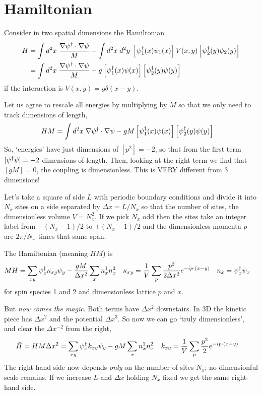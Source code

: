 \section{Hamiltonian}\label{sec:hamiltonian}

Consider in two spatial dimensions the Hamiltonian
\begin{align}
	H
	&= \int d^2x\; \frac{\nabla \psi{}^{\dagger} \cdot \nabla \psi}{M} - \int d^2x\; d^2y\; \left[\psi{}^{\dagger}_1(x) \psi_1(x)\right] V(x,y) \left[\psi{}^{\dagger}_2(y) \psi_2(y)\right]
	\\
	&= \int d^2x\; \frac{\nabla \psi{}^{\dagger} \cdot \nabla \psi}{M} - g \left[\psi{}^{\dagger}_1(x) \psi(x)\right] \left[\psi{}^{\dagger}_2(y) \psi(y)\right]
\end{align}
if the interaction is $V(x,y) = g \delta(x-y)$.

Let us agree to rescale all energies by multiplying by $M$ so that we only need to track dimensions of length,
\begin{align}
	HM
	&= \int d^2x\; \nabla \psi{}^{\dagger} \cdot \nabla \psi - gM \left[\psi{}^{\dagger}_1(x) \psi(x)\right] \left[\psi{}^{\dagger}_2(y) \psi(y)\right]
\end{align}
So, `energies' have just dimensions of $[p^2] = -2$, so that from the first term $[\psi{}^{\dagger}\psi] = -2$ dimensions of length.
Then, looking at the right term we find that $[gM] = 0$, the coupling is dimensionless.
This is VERY different from 3 dimensions!

Let's take a square of side $L$ with periodic boundary conditions and divide it into $N_x$ sites on a side separated by $\Delta x = L/N_x$ so that the number of sites, the dimensionless volume $V=N_x^2$.
If we pick $N_x$ odd then the sites take an integer label from $-(N_x-1)/2$ to $+(N_x-1)/2$ and the dimensionless momenta $p$ are $2\pi / N_x$ times that same span.

The Hamiltonian (meaning $HM$) is
\begin{align}
	MH &= \sum_{xy} \psi{}^{\dagger}_x \kappa_{xy} \psi_y - \frac{gM}{\Delta x^2} \sum_{x} n^1_x n^2_x
	&
	\kappa_{xy} &= \frac{1}{V} \sum_{p} \frac{p^2}{2\Delta x^2} e^{-i p \cdot (x-y)}
	&
	n_x &= \psi{}^{\dagger}_x \psi_x
\end{align}
for spin species 1 and 2 and dimensionless lattice $p$ and $x$.

But \emph{now comes the magic}.
Both terms have $\Delta x^2$ downstairs.
In 3D the kinetic piece has $\Delta x^2$ and the potential $\Delta x^3$.
So now we can go `truly dimensionless', and clear the $\Delta x^{-2}$ from the right,
\begin{align}
	\tilde{H} = HM \Delta x^2
	&=
	\sum_{xy} \psi{}^{\dagger}_x k_{xy} \psi_y - gM \sum_x n^1_x n^2_x
	&
	k_{xy} &= \frac{1}{V} \sum_{p} \frac{p^2}{2} e^{-i p \cdot (x-y)}
	\label{eq:hamiltonian}
\end{align}
The right-hand side now depends \emph{only} on the number of sites $N_x$; no dimensionful scale remains.
If we increase $L$ and $\Delta x$ holding $N_x$ fixed we get the same right-hand side.

